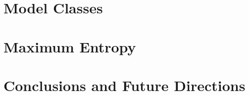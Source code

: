 \documentclass[submission, Phys]{SciPost}
\begin{document}
\section{Model Classes}\label{sec:model_classes}

\section{Maximum Entropy}\label{sec:maxent}

\section{Conclusions and Future Directions}\label{sec:con}


\begin{appendix}


\end{appendix}

\printindex

\nolinenumbers
\end{document}
